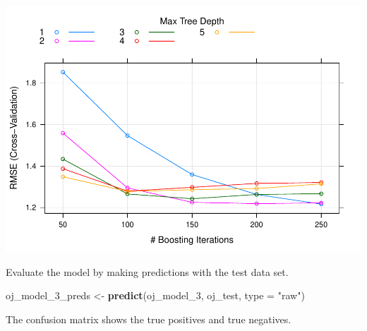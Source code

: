 \documentclass[
]{book}
\newenvironment{Shaded}{\begin{snugshade}}{\end{snugshade}}
\newcommand{\DataTypeTok}[1]{\textcolor[rgb]{0.13,0.29,0.53}{#1}}
\newcommand{\DecValTok}[1]{\textcolor[rgb]{0.00,0.00,0.81}{#1}}
\newcommand{\KeywordTok}[1]{\textcolor[rgb]{0.13,0.29,0.53}{\textbf{#1}}}
\newcommand{\NormalTok}[1]{#1}
\newcommand{\OperatorTok}[1]{\textcolor[rgb]{0.81,0.36,0.00}{\textbf{#1}}}
\newcommand{\StringTok}[1]{\textcolor[rgb]{0.31,0.60,0.02}{#1}}
\begin{document}
\includegraphics{data-sci_files/figure-latex/unnamed-chunk-87-1.pdf}

Evaluate the model by making predictions with the test data set.

\begin{Shaded}
\begin{Highlighting}[]
\NormalTok{oj_model_}\DecValTok{3}\NormalTok{_preds <-}\StringTok{ }\KeywordTok{predict}\NormalTok{(oj_model_}\DecValTok{3}\NormalTok{, oj_test, }\DataTypeTok{type =} \StringTok{"raw"}\NormalTok{)}
\end{Highlighting}
\end{Shaded}

The confusion matrix shows the true positives and true negatives.

\begin{Shaded}
\end{Shaded}
\end{document}
